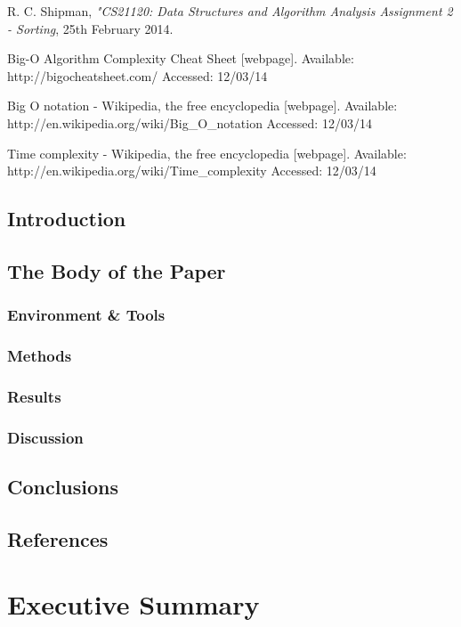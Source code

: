 \documentclass{acm_proc_article-sp}
\begin{document}
\begin{thebibliography}{1}

 R. C. Shipman, {\em "CS21120: Data Structures and Algorithm Analysis Assignment 2 - Sorting}, 25th February 2014.

Big-O Algorithm Complexity Cheat Sheet [webpage]. Available: http://bigocheatsheet.com/ Accessed: 12/03/14

Big O notation - Wikipedia, the free encyclopedia [webpage]. Available: http://en.wikipedia.org/wiki/Big\_O\_notation Accessed: 12/03/14

Time complexity - Wikipedia, the free encyclopedia [webpage]. Available: http://en.wikipedia.org/wiki/Time\_complexity Accessed: 12/03/14

\end{thebibliography}

\appendix
\subsection{Introduction}
\subsection{The Body of the Paper}
\subsubsection{Environment \& Tools}
\subsubsection{Methods}
\subsubsection{Results}
\subsubsection{Discussion}
\subsection{Conclusions}
\subsection{References}


\section{Executive Summary}
\end{document}

